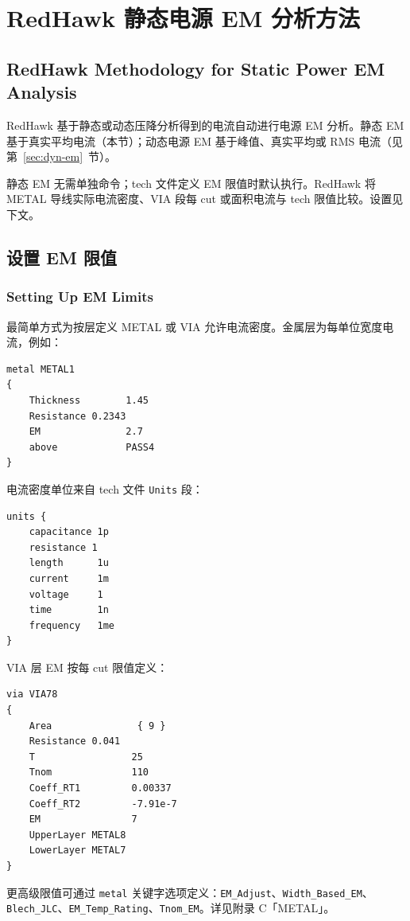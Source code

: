 \section{RedHawk 静态电源 EM 分析方法}
\subsection*{RedHawk Methodology for Static Power EM Analysis}

RedHawk 基于静态或动态压降分析得到的电流自动进行电源 EM 分析。静态 EM 基于真实平均电流（本节）；动态电源 EM 基于峰值、真实平均或 RMS 电流（见第~\ref{sec:dyn-em}~节）。

静态 EM 无需单独命令；tech 文件定义 EM 限值时默认执行。RedHawk 将 METAL 导线实际电流密度、VIA 段每 cut 或面积电流与 tech 限值比较。设置见下文。

\subsection{设置 EM 限值}
\subsubsection*{Setting Up EM Limits}

最简单方式为按层定义 METAL 或 VIA 允许电流密度。金属层为每单位宽度电流，例如：
\begin{lstlisting}
metal METAL1
{
    Thickness        1.45
    Resistance 0.2343
    EM               2.7
    above            PASS4
}
\end{lstlisting}

电流密度单位来自 tech 文件 \texttt{Units} 段：
\begin{lstlisting}
units {
    capacitance 1p
    resistance 1
    length      1u
    current     1m
    voltage     1
    time        1n
    frequency   1me
}
\end{lstlisting}

VIA 层 EM 按每 cut 限值定义：
\begin{lstlisting}
via VIA78
{
    Area               { 9 }
    Resistance 0.041
    T                 25
    Tnom              110
    Coeff_RT1         0.00337
    Coeff_RT2         -7.91e-7
    EM                7
    UpperLayer METAL8
    LowerLayer METAL7
}
\end{lstlisting}

更高级限值可通过 \texttt{metal} 关键字选项定义：\texttt{EM\_Adjust}、\texttt{Width\_Based\_EM}、\texttt{Blech\_JLC}、\texttt{EM\_Temp\_Rating}、\texttt{Tnom\_EM}。详见附录 C「METAL」。

